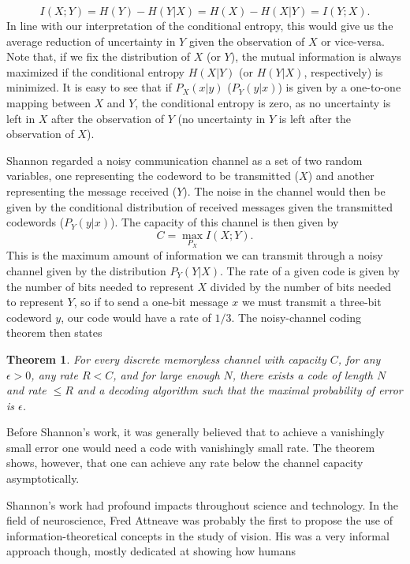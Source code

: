 $$
I(X;Y) = H(Y) - H(Y|X) = H(X) - H(X|Y) = I(Y;X).
$$
In line with our interpretation of the conditional entropy, this would give us the average reduction of uncertainty in $Y$ given the observation of $X$ or vice-versa. Note that, if we fix the distribution of $X$ (or $Y$), the mutual information is always maximized if the conditional entropy $H(X|Y)$ (or $H(Y|X)$, respectively) is minimized. It is easy to see that if $P_X(x|y)$ ($P_Y(y|x)$) is given by a one-to-one mapping between $X$ and $Y$, the conditional entropy is zero, as no uncertainty is left in $X$ after the observation of $Y$ (no uncertainty in $Y$ is left after the observation of $X$).\par
Shannon regarded a noisy communication channel as a set of two random variables, one representing the codeword to be transmitted ($X$) and another representing the message received ($Y$). The noise in the channel would then be given by the conditional distribution of received messages given the transmitted codewords ($P_Y(y|x)$). The capacity of this channel is then given by
$$
C = \max_{P_X} I(X;Y).
$$
This is the maximum amount of information we can transmit through a noisy channel given by the distribution $P_Y(Y|X)$.
The rate of a given code is given by the number of bits needed to represent $X$ divided by the number of bits needed to represent $Y$, so if to send a one-bit message $x$ we must transmit a three-bit codeword $y$, our code would have a rate of $1/3$.
The noisy-channel coding theorem\cite{mackay2003information} then states
\newtheorem{noisychannel}{Theorem}
\begin{noisychannel}
\label{thm:noisychannel}
For every discrete memoryless channel with capacity $C$, for any $\epsilon>0$, any rate $R<C$, and for large enough $N$, there exists a code of length $N$ and rate $\leq R$ and a decoding algorithm such that the maximal probability of %
error is $\epsilon$.
\end{noisychannel}
Before Shannon's work, it was generally believed that to achieve a vanishingly small error one would need a code with vanishingly small rate. The theorem shows, however, that one can achieve any rate below the channel capacity asymptotically.\par
Shannon's work had profound impacts throughout science and technology. In the field of neuroscience, Fred Attneave was probably the first to propose the use
of information-theoretical concepts in the study of vision.\cite{Attneave1954} His was a very informal approach though, mostly dedicated at showing how humans
